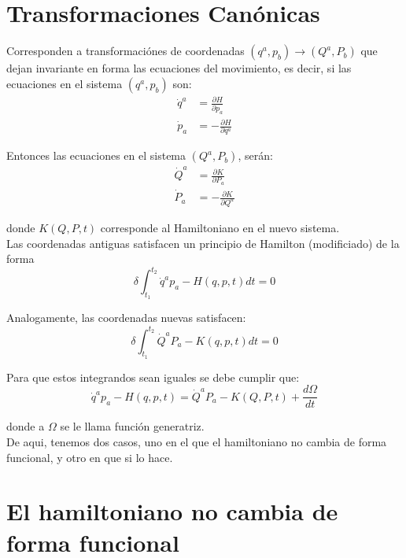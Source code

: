 \documentclass[paper=a4, fontsize=11pt,twoside]{scrartcl}
\begin{document}
\section{Transformaciones Can\'onicas}

Corresponden a transformaci\'ones de coordenadas $(q^{a},p_{b}) \rightarrow (Q^{a},P_{b})$ que dejan invariante en 
forma las ecuaciones del movimiento, es decir, si las ecuaciones en el sistema $(q^{a},p_{b}) $ son:
	\begin{align*}
		\dot{q}^{a} &= \frac{\partial H}{\partial p_{a}} \\
		 \dot{p}_{a} &= -\frac{\partial H}{\partial q^{a}}
	\end{align*}

Entonces las ecuaciones en el sistema $(Q^{a},P_{b})$, ser\'an:
	\begin{align*}
		\dot{Q}^{a} &= \frac{\partial K}{\partial P_{a}} \\
	    \dot{P}_{a} &= -\frac{\partial K}{\partial Q^{a}}
	\end{align*}

donde $K(Q,P,t)$ corresponde al Hamiltoniano en el nuevo sistema.\\

Las coordenadas antiguas satisfacen un principio de Hamilton (modificiado) de la forma
	\begin{equation*}
		\delta\int^{t_{2}}_{t_{1}} \dot{q}^{a}p_{a} - H(q,p,t) dt = 0
	\end{equation*}
	
Analogamente, las coordenadas nuevas satisfacen:
	\begin{equation*}
		\delta\int^{t_{2}}_{t_{1}} \dot{Q}^{a}P_{a} - K(q,p,t) dt = 0
	\end{equation*}

Para que estos integrandos sean iguales se debe cumplir que:
	\begin{equation*}
		\dot{q}^{a}p_{a} - H(q,p,t) =  \dot{Q}^{a}P_{a} - K(Q,P,t)  + \frac{d\Omega}{dt}
	\end{equation*}

donde a $\Omega$ se le llama funci\'on generatriz.\\

De aqui, tenemos dos casos, uno en el que el hamiltoniano no cambia de forma funcional, y otro en que si lo hace.

\section{El hamiltoniano no cambia de forma funcional}
\end{document}
